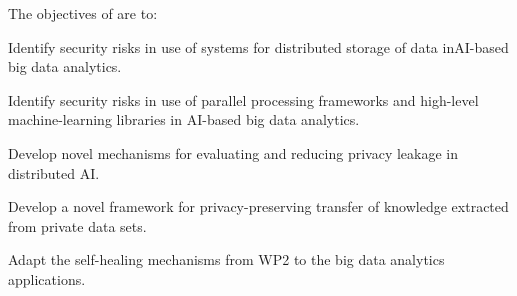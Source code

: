 \addtocounter{wpno}{1}
\begin{Workpackage}{\thewpno}
\WPTitle{\wpname{\thewpno}}

\begin{WPObjectives}
The objectives of \theWP{} are to:
\begin{compactitem}
\item Identify security risks in use of systems for distributed storage of data inAI-based big data analytics.
\item Identify security risks in use of parallel processing frameworks and high-level machine-learning libraries in AI-based big data analytics.
\item Develop novel mechanisms for evaluating and reducing privacy leakage in distributed AI.
\item Develop a novel framework for privacy-preserving transfer of knowledge extracted from private data sets.
\item Adapt the self-healing mechanisms from WP2 to the big data analytics applications.
\end{compactitem}
\end{WPObjectives}


\end{Workpackage}
